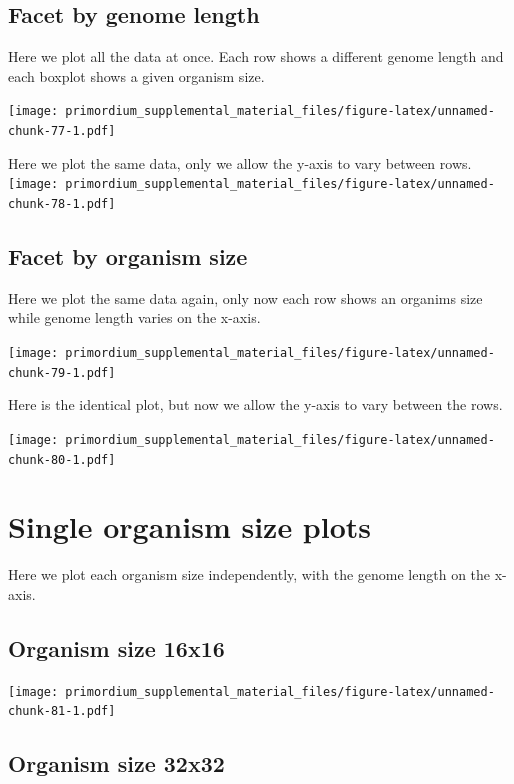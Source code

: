 \documentclass[]{book}
\begin{document}
\hypertarget{facet-by-genome-length}{%
\subsection{Facet by genome length}\label{facet-by-genome-length}}

Here we plot all the data at once.
Each row shows a different genome length and each boxplot shows a given organism size.

\texttt{[image: primordium\_supplemental\_material\_files/figure-latex/unnamed-chunk-77-1.pdf]}

Here we plot the same data, only we allow the y-axis to vary between rows.
\texttt{[image: primordium\_supplemental\_material\_files/figure-latex/unnamed-chunk-78-1.pdf]}

\hypertarget{facet-by-organism-size-2}{%
\subsection{Facet by organism size}\label{facet-by-organism-size-2}}

Here we plot the same data again, only now each row shows an organims size while genome length varies on the x-axis.

\texttt{[image: primordium\_supplemental\_material\_files/figure-latex/unnamed-chunk-79-1.pdf]}

Here is the identical plot, but now we allow the y-axis to vary between the rows.

\texttt{[image: primordium\_supplemental\_material\_files/figure-latex/unnamed-chunk-80-1.pdf]}

\hypertarget{single-organism-size-plots-3}{%
\section{Single organism size plots}\label{single-organism-size-plots-3}}

Here we plot each organism size independently, with the genome length on the x-axis.

\hypertarget{organism-size-16x16-2}{%
\subsection{Organism size 16x16}\label{organism-size-16x16-2}}

\texttt{[image: primordium\_supplemental\_material\_files/figure-latex/unnamed-chunk-81-1.pdf]}

\hypertarget{organism-size-32x32-2}{%
\subsection{Organism size 32x32}\label{organism-size-32x32-2}}
\end{document}
